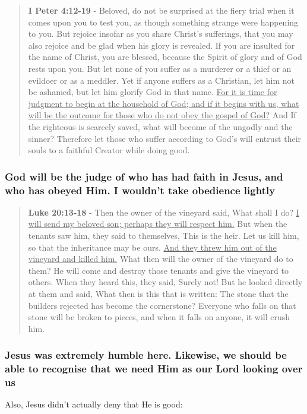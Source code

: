 \documentclass[11pt]{article}
\begin{document}
\begin{quote}
\textbf{I Peter 4:12-19} - Beloved, do not be surprised at the fiery trial when it comes upon you to test you, as though something strange were happening to you. But rejoice insofar as you share Christ's sufferings, that you may also rejoice and be glad when his glory is revealed. If you are insulted for the name of Christ, you are blessed, because the Spirit of glory and of God rests upon you. But let none of you suffer as a murderer or a thief or an evildoer or as a meddler. Yet if anyone suffers as a Christian, let him not be ashamed, but let him glorify God in that name. \uline{For it is time for judgment to begin at the household of God; and if it begins with us, what will be the outcome for those who do not obey the gospel of God?} And If the righteous is scarcely saved, what will become of the ungodly and the sinner? Therefore let those who suffer according to God's will entrust their souls to a faithful Creator while doing good.
\end{quote}

\subsubsection{God will be the judge of who has had faith in Jesus, and who has obeyed Him. I wouldn't take obedience lightly}
\label{sec:org1cc975c}
\begin{quote}
\textbf{Luke 20:13-18} - Then the owner of the vineyard said, What shall I do? \uline{I will send my beloved son; perhaps they will respect him.} But when the tenants saw him, they said to themselves, This is the heir. Let us kill him, so that the inheritance may be ours. \uline{And they threw him out of the vineyard and killed him.} What then will the owner of the vineyard do to them? He will come and destroy those tenants and give the vineyard to others. When they heard this, they said, Surely not! But he looked directly at them and said, What then is this that is written: The stone that the builders rejected has become the cornerstone? Everyone who falls on that stone will be broken to pieces, and when it falls on anyone, it will crush him.
\end{quote}

\subsubsection{Jesus was extremely humble here. Likewise, we should be able to recognise that we need Him as our Lord looking over us}
\label{sec:org411c8c1}
Also, Jesus didn't actually deny that He is good:
\end{document}
